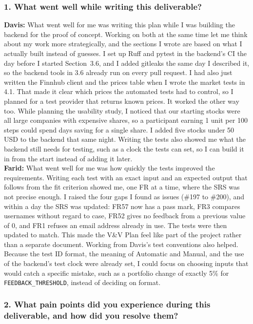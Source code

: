 \documentclass[12pt, titlepage]{article}
\begin{document}
\subsubsection*{1. What went well while writing this deliverable?}
\noindent\textbf{Davis:} What went well for me was writing this plan while I
was building the backend for the proof of concept. Working on both at the same
time let me think about my work more strategically, and the sections I wrote
are based on what I actually built instead of guesses. I set up Ruff and pytest
in the backend's CI the day before I started Section~3.6, and I added gitleaks
the same day I described it, so the backend tools in 3.6 already run on every
pull request. I had also just written the Finnhub client and the prices table
when I wrote the market tests in 4.1. That made it clear which prices the
automated tests had to control, so I planned for a test provider that returns
known prices. It worked the other way too. While planning the usability study,
I noticed that our starting stocks were all large companies with expensive
shares, so a participant earning 1 unit per 100 steps could spend days saving
for a single share. I added five stocks under 50 USD to the backend that same
night. Writing the tests also showed me what the backend still needs for
testing, such as a clock the tests can set, so I can build it in from the start
instead of adding it later.\\

\noindent\textbf{Farid:} What went well for me was how quickly the tests
improved the requirements. Writing each test with an exact input and an
expected output that follows from the fit criterion showed me, one FR at a
time, where the SRS was not precise enough. I raised the four gaps I found as
issues (\#197 to \#200), and within a day the SRS was updated: FR57 now has a
pass mark, FR3 compares usernames without regard to case, FR52 gives no
feedback from a previous value of 0, and FR1 refuses an email address already
in use. The tests were then updated to match. This made the V\&V Plan feel
like part of the project rather than a separate document. Working from Davis's
test conventions also helped. Because the test ID format, the meaning of
Automatic and Manual, and the use of the backend's test clock were already set,
I could focus on choosing inputs that would catch a specific mistake, such as
a portfolio change of exactly 5\% for \texttt{FEEDBACK\_THRESHOLD}, instead of
deciding on format.

\subsubsection*{2. What pain points did you experience during this deliverable,
and how did you resolve them?}
\end{document}
